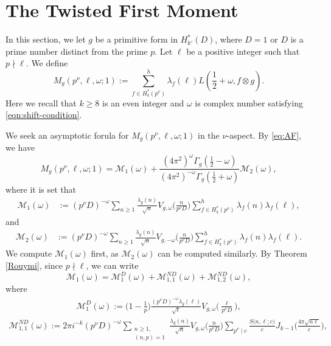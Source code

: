 \documentclass[12pt]{amsart}
\theoremstyle{plain}
\theoremstyle{definition}
\begin{document}


\section{The Twisted First Moment}\label{sec:first moment}

In this section, we let $g$ be a primitive form  in $H^*_{k'}(D)$, where $D=1$ or $D$ is a prime number distinct from the prime $p$. Let $\ell$ be a positive integer such that $p\nmid \ell$. We define 
    \[
    M_g(p^{\nu},\ell, \omega ;1)
    := \sum_{f\in H^*_k(p^\nu)}^{h}
    \lambda_f(\ell)
    L\left(\frac12+\omega, f\otimes g\right).
    \]
Here we recall that $k\geq8$ is an even integer and $\omega$ is complex number satisfying \eqref{eqn:shift-condition}. 

We seek an asymptotic forula for  $M_g(p^{\nu},\ell, \omega ;1)$ in the $\nu$-aspect. By \eqref{eq:AF}, we have
    \begin{equation*} 
    M_g(p^{\nu},\ell, \omega;1)
    = \mathcal{M}_1(\omega)+\frac{(4\pi^2)^{\omega} \Gamma_g(\frac12-\omega)}{(4\pi^2)^{-\omega} \Gamma_g(\frac12+\omega)}  \mathcal{M}_2(\omega),\end{equation*}
    where it is set that
    \begin{align*}
    \mathcal{M}_1(\omega)&:=(p^\nu D)^{- \omega}  \sum_{n \geq 1}
    \frac{\lambda_g(n) }{\sqrt{n}} 
    V_{g, \omega}\Big(\frac{n}{p^\nu D}\Big)
     \sum^h_{f\in H^*_k(p^\nu)}  \lambda_f(n) \lambda_f(\ell),  \end{align*}
     and
     \begin{align*}
    \mathcal{M}_2(\omega) &:=
    (p^\nu D)^{-\omega}  \sum_{n \geq 1}
    \frac{\lambda_g(n) }{\sqrt{n}} 
    V_{g, -\omega}\Big(\frac{n}{p^\nu D}\Big)
     \sum^h_{f\in H^*_k(p^\nu)}  \lambda_f(n) \lambda_f(\ell).
     \end{align*}
 We compute $\mathcal{M}_1(\omega)$ first, as $ \mathcal{M}_2(\omega)$ can be computed similarly. By Theorem \ref{Rouymi}, since $p\nmid \ell$, we can write
    \[
     \mathcal{M}_1(\omega)
     =  \mathcal{M}_1^D(\omega)
     + \mathcal{M}_{1,1}^{ND}(\omega)+ \mathcal{M}_{1,2}^{ND}(\omega),
    \]
where
    \begin{align*}
      \mathcal{M}_1^D(\omega)
     :=  \Big(1-\frac{1}{p}\Big) \frac{(p^\nu D)^{-\omega} \lambda_g(\ell)}{\sqrt\ell} 
    V_{g, \omega}\Big(\frac{\ell }{p^\nu D}\Big), 
    \end{align*}
    \begin{align*}
     \mathcal{M}_{1,1}^{ND}(\omega)
    := 2\pi i^{-k} (p^\nu D)^{-\omega}  
     \sum_{\substack{n\geq 1, \\ (n, p)=1}}
    \frac{\lambda_g(n)}{\sqrt n} 
    V_{g, \omega}\Big(\frac{n}{p^\nu D}\Big)
    \sum_{p^\nu \mid c} 
    \frac{S\big(n, \ell; c\big)}{c}
    J_{k-1}\Big(\frac{4\pi\sqrt{n\ell}}{c}\Big),
    \end{align*}
\end{document}
